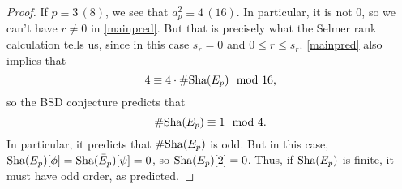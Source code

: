 \documentclass[12pt, a4paper]{report}
\begin{document}
\begin{proof}
  If $p \equiv 3 \, (8)$, we see that $a_p^2 \equiv 4 \,
  (16).$ In particular,
  it is not 0, so we can't have $r \neq 0$ in \autoref{mainpred}. 
  But that is precisely what the Selmer rank calculation tells us, since in this
  case $s_r =
  0$ and $0 \leq r \leq s_r.$
  \autoref{mainpred} also implies that
  \[4 \equiv 4 \cdot \# \text{\normalfont Sha}(E_p) \mod{16},\]
  so the BSD conjecture predicts that
  \[\# \text{\normalfont Sha}(E_p) \equiv 1 \mod{4}.\]
  In particular, it predicts that $\#\text{\normalfont Sha}(E_p)$ is odd.
  But in this case, $\text{\normalfont Sha}(E_p)[\phi] = \text{\normalfont Sha}(\bar{E}_p)[\psi] = 0$, so
  $\text{\normalfont Sha}(E_p)[2] = 0$. Thus, if $\text{\normalfont Sha}(E_p)$ is finite, it must have odd order, as predicted.

\end{proof}

\printbibliography[heading=bibintoc]
\end{document}
